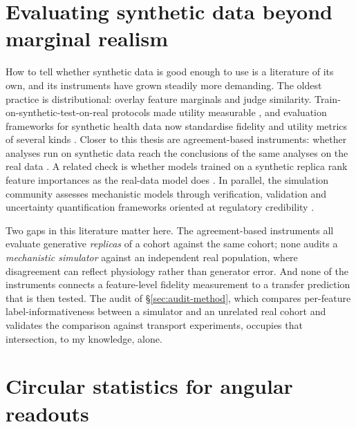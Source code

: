 \section{Evaluating synthetic data beyond marginal realism}
\label{sec:bg-syntheval}

How to tell whether synthetic data is good enough to use is a literature of its own, and its instruments have grown steadily more demanding. The oldest practice is distributional: overlay feature marginals and judge similarity. Train-on-synthetic-test-on-real protocols made utility measurable \citep{esteban2017real}, and evaluation frameworks for synthetic health data now standardise fidelity and utility metrics of several kinds \citep{goncalves2020generation,alaa2021faithful}. Closer to this thesis are agreement-based instruments: whether analyses run on synthetic data reach the conclusions of the same analyses on the real data \citep{elemam2024replicability}. A related check is whether models trained on a synthetic replica rank feature importances as the real-data model does \citep{hudovernik2024benchmarking,ortuno2026highfidelity}. In parallel, the simulation community assesses mechanistic models through verification, validation and uncertainty quantification frameworks oriented at regulatory credibility \citep{morrison2019credibility,viceconti2021insilico,pathmanathan2024credibility}.

Two gaps in this literature matter here. The agreement-based instruments all evaluate generative \emph{replicas} of a cohort against the same cohort; none audits a \emph{mechanistic simulator} against an independent real population, where disagreement can reflect physiology rather than generator error. And none of the instruments connects a feature-level fidelity measurement to a transfer prediction that is then tested. The audit of \S\ref{sec:audit-method}, which compares per-feature label-informativeness between a simulator and an unrelated real cohort and validates the comparison against transport experiments, occupies that intersection, to my knowledge, alone. 

\section{Circular statistics for angular readouts}
\label{sec:bg-circ}

